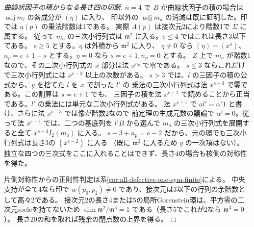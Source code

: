 \begin{proof}[曲線状因子の積からなる長さ四の切断]
$n=4$ で $B$ が曲線状因子の積の場合は $\operatorname{adj}m_l$ の各成分が $(\eta)$ に入り、
印以外の $\operatorname{adj}m_a$ の消滅は既に証明した。印では $a(p)$ の乗法階数は1である。
実際 $A(p)$ は接次元2により階数1で $\Sigma$ に属する。
従って $m_a$ の三次小行列式は $\mathfrak m^2$ に入る。$e\le4$ ではこれは長さ3以下である。
$e\ge5$ とする。$\eta$ は外積から $\mathfrak m^2$ に入り、
$\eta\ne0$ なら $(\eta)=(x^s)$、$n_p=e+1-s$ とする。$\eta=0$ なら $s=e+1,n_p=0$ とする。
$Z$ 上で $m_a$ が階数1なので、その二次小行列式の $x$ 部分は法 $x^{n_p}$ で零である。
$s\le3$ ならこれだけで三次小行列式には $x^{e-2}$ 以上の次数がある。
$s>3$ では、$l$ の三因子の積の公式から、$y$ を捨てた $l$ を $x$ で割った $l'$ の
乗法の三次小行列式は法 $x^{s-3}$ で零である。この割算は $s=e+1$ でも、
三因子の積を法 $x^{e+1}$ で読めることから正当である。$l'$ の乗法には単元な二次小行列式がある。
法 $x^{e-1}$ で $al'=\alpha'1$ と書け、さらに法 $x^{s-3}$ では像が階数2なので
前定理の生成元数の議論で $\alpha'=0$。従って法 $x^{e-1}$ では、二つの基底列を $l'B$ から選んで
$m_a$ の三次小行列式を展開すると全て $x^{s-3} I_2(m_a)$ に入る。
$s-3+n_p=e-2$ だから、元の環でも三次小行列式は長さ3の $(x^{e-2})$ に入る
（既に $\mathfrak m^2$ に入るため $y$ の一次項はない）。
独立な四つの三次式をここに入れることはできず、長さ4の場合も核側の対称性を得た。

片側対称性からの正則性判定は系\ref{cor:all-defective-one-sym-finite}による。
中央支持が全て4なら印で $w(p_0,p_2)\ne0$ であり、接次元は3以下の行列の余階数として高々2である。
接次元2の長さ4または5の局所Gorenstein環は、平方零の二次元socleを持てないため
$\dim\mathfrak m^2/\mathfrak m^3=1$ である（長さ5でこれが2なら $\mathfrak m^3=0$）。
長さ20の和を取れば残余の閉点数の上界を得る。
\end{proof}
